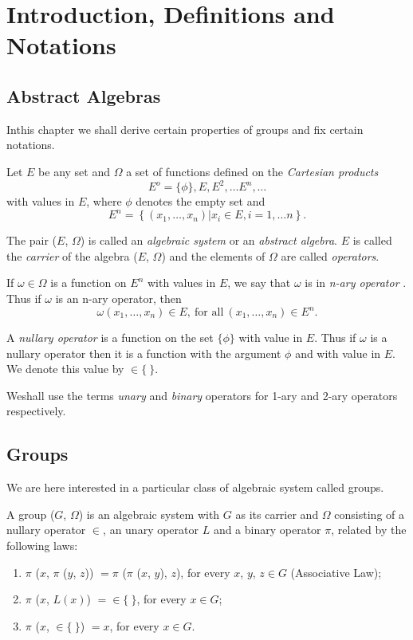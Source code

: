 
\chapter{Introduction, Definitions and Notations}\label{chap1}

\section{Abstract Algebras}\label{chap1:sec1} %

In\pageoriginale this chapter we shall derive certain properties of
groups and fix certain notations.

Let $E$ be any set and $\Omega$ a set of functions defined on the
\textit{Cartesian products} 
$$
E^o = \{\phi\}, E, E^2,  \ldots E^n,  \ldots
$$
with values in $E$, where $\phi$ denotes the empty set and 
$$
E^n = \left\{ (x_1,  \ldots,  x_n) \big| x_i \in  E, i=1, 
\ldots n \right\}. 
$$

The pair ($E$, $\Omega$) is called an \textit{algebraic system } or an
\textit{abstract algebra}. $E$ is called the \textit{carrier} of the
algebra ($E$, $\Omega$) and the elements of $\Omega$ are called
\textit{operators}. 

If $\omega \in  \Omega$ is a function on $E^n$ with values in
$E$, we say that $\omega$ is in \textit{n-ary operator }. Thus if
$\omega$ is an n-ary operator, then 
$$
\omega (x_1, \ldots, x_n) \in  E, ~\text{for all}~ (x_1,  \ldots
, x_n) \in  E^n. 
$$

A \textit{nullary operator } is a function on the set $\{ \phi \}$
with value in $E$. Thus if $\omega$ is a nullary operator then it is a
function with the argument  $\phi$ and with value in $E$. We denote
this value by $\in  \{~ \}$. 

We\pageoriginale shall use the terms \textit{unary} and \textit{binary} operators
for 1-ary and 2-ary operators respectively. 

\section{Groups}\label{chap1:sec2} %

We are here interested in a particular class of algebraic system
called groups. 
\begin{defi*}
  A group ($G$, $\Omega$) is an algebraic system with $G$ as its
  carrier and $\Omega$ consisting of a nullary operator $\in $,
  an unary operator $L$ and a binary operator $\pi$, related by the
  following laws: 
  \begin{enumerate}[(1)]
  \item $\pi$ ($x$, $\pi$ ($y$, $z$)) $= \pi$ ($\pi$ ($x$, $y$), $z$),
    for every $x$, $y$, $z \in  G$ (Associative Law); 
  \item $\pi$ ($x$, $L (x)$) $= \in  \{~ \}$, for every $x
    \in  G$; 
  \item $\pi$ ($x$, $\in  \{~\}$) $= x$, for every $x \in  G$. 
  \end{enumerate}
\end{defi*}

